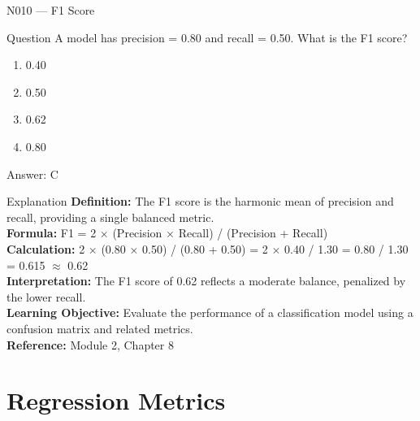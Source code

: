 \documentclass[aspectratio=169,8pt]{beamer}
\begin{document}
	\begin{frame}{N010 --- F1 Score}
		\begin{block}{Question}
			A model has precision = 0.80 and recall = 0.50. What is the F1 score?
			\begin{enumerate}
				\item 0.40
				\item 0.50
				\item 0.62
				\item 0.80
			\end{enumerate}
		\end{block}
		\begin{exampleblock}{Answer: C}\end{exampleblock}
		\begin{block}{Explanation}
			\textbf{Definition:} The F1 score is the harmonic mean of precision and recall, providing a single balanced metric.\\
			\textbf{Formula:} F1 = 2 $\times$ (Precision $\times$ Recall) / (Precision + Recall)\\
			\textbf{Calculation:} 2 $\times$ (0.80 $\times$ 0.50) / (0.80 + 0.50) = 2 $\times$ 0.40 / 1.30 = 0.80 / 1.30 = 0.615 $\approx$ 0.62\\
			\textbf{Interpretation:} The F1 score of 0.62 reflects a moderate balance, penalized by the lower recall.\\
			\textbf{Learning Objective:} Evaluate the performance of a classification model using a confusion matrix and related metrics.\\
			\textbf{Reference:} Module 2, Chapter 8
		\end{block}
	\end{frame}
	
	\section{Regression Metrics}
	
\end{document}
